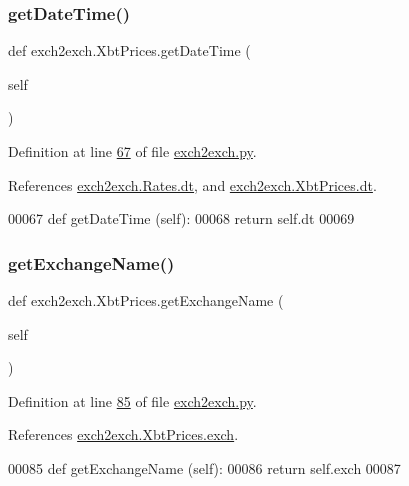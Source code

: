 \subsubsection{\texorpdfstring{get\+Date\+Time()}{getDateTime()}}
{\footnotesize\ttfamily def exch2exch.\+Xbt\+Prices.\+get\+Date\+Time (\begin{DoxyParamCaption}\item[{}]{self }\end{DoxyParamCaption})}



Definition at line \hyperlink{exch2exch_8py_source_l00067}{67} of file \hyperlink{exch2exch_8py_source}{exch2exch.\+py}.



References \hyperlink{exch2exch_8py_source_l00028}{exch2exch.\+Rates.\+dt}, and \hyperlink{exch2exch_8py_source_l00057}{exch2exch.\+Xbt\+Prices.\+dt}.


\begin{DoxyCode}
00067     \textcolor{keyword}{def }getDateTime (self):
00068         \textcolor{keywordflow}{return} self.dt
00069         
\end{DoxyCode}
\mbox{\label{classexch2exch_1_1_xbt_prices_ac6e393f1a446218dcb31d00dd8858912}} 
\subsubsection{\texorpdfstring{get\+Exchange\+Name()}{getExchangeName()}}
{\footnotesize\ttfamily def exch2exch.\+Xbt\+Prices.\+get\+Exchange\+Name (\begin{DoxyParamCaption}\item[{}]{self }\end{DoxyParamCaption})}



Definition at line \hyperlink{exch2exch_8py_source_l00085}{85} of file \hyperlink{exch2exch_8py_source}{exch2exch.\+py}.



References \hyperlink{exch2exch_8py_source_l00064}{exch2exch.\+Xbt\+Prices.\+exch}.


\begin{DoxyCode}
00085     \textcolor{keyword}{def }getExchangeName (self):
00086         \textcolor{keywordflow}{return} self.exch
00087         
\end{DoxyCode}
\mbox{\label{classexch2exch_1_1_xbt_prices_a3cf0b53b06d0e83a15bb682b7b47a073}} 
